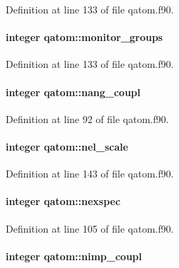 Definition at line 133 of file qatom.\-f90.

\hypertarget{classqatom_a5a430edee24994b0451d502eeba4354d}{
\paragraph[{monitor\-\_\-groups}]{\setlength{\rightskip}{0pt plus 5cm}integer qatom\-::monitor\-\_\-groups}}\label{classqatom_a5a430edee24994b0451d502eeba4354d}


Definition at line 133 of file qatom.\-f90.

\hypertarget{classqatom_a08d7f9f7144e8187c01c14f85ea1672e}{
\paragraph[{nang\-\_\-coupl}]{\setlength{\rightskip}{0pt plus 5cm}integer qatom\-::nang\-\_\-coupl}}\label{classqatom_a08d7f9f7144e8187c01c14f85ea1672e}


Definition at line 92 of file qatom.\-f90.

\hypertarget{classqatom_a1faef5321ae7b901fb70e24a9f56c40b}{
\paragraph[{nel\-\_\-scale}]{\setlength{\rightskip}{0pt plus 5cm}integer qatom\-::nel\-\_\-scale}}\label{classqatom_a1faef5321ae7b901fb70e24a9f56c40b}


Definition at line 143 of file qatom.\-f90.

\hypertarget{classqatom_ad23eb0f3674a085828b3536f2d2d0129}{
\paragraph[{nexspec}]{\setlength{\rightskip}{0pt plus 5cm}integer qatom\-::nexspec}}\label{classqatom_ad23eb0f3674a085828b3536f2d2d0129}


Definition at line 105 of file qatom.\-f90.

\hypertarget{classqatom_a4afd5a33301007292bca9293ee2df063}{
\paragraph[{nimp\-\_\-coupl}]{\setlength{\rightskip}{0pt plus 5cm}integer qatom\-::nimp\-\_\-coupl}}\label{classqatom_a4afd5a33301007292bca9293ee2df063}



